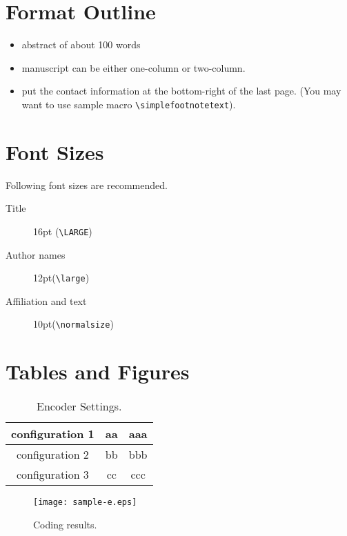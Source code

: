 \documentclass[10pt]{article}
\begin{document}
\vspace{5cm}

\section{Format Outline}

\begin{itemize}
\item abstract of about 100 words
\item manuscript can be either one-column or two-column.
\item put the contact information at the bottom-right of the 
      last page. (You may want to use sample macro \verb|\simplefootnotetext|).
\end{itemize}


\vspace{5cm}

\section{Font Sizes}

Following font sizes are recommended.
\begin{description}
\item[Title] 16pt (\verb|\LARGE|)
\item[Author names] 12pt(\verb|\large|)
\item[Affiliation and text] 10pt(\verb|\normalsize|)
\end{description}


\vspace{5cm}

\section{Tables and Figures}

\begin{table}[tb]
\caption{Encoder Settings.}
\label{tab:settings}
\centering
\begin{tabular}{c||c|c}\hline
 configuration 1 & aa & aaa\\\hline
 configuration 2 & bb & bbb\\\hline
 configuration 3 & cc & ccc\\\hline
\end{tabular}
\end{table}

\begin{figure}[tb]
\centering
\texttt{[image: sample-e.eps]}\\
\caption{Coding results.}
\label{fig:results}
\end{figure}
\end{document}
